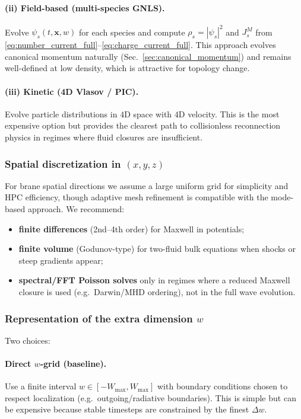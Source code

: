 \documentclass[11pt]{article}
\newcommand{\x}{\mathbf{x}}     %
\newcommand{\Js}{J_s}           %
\begin{document}
\paragraph{(ii) Field-based (multi-species GNLS).}
Evolve \(\psi_s(t,\x,w)\) for each species and compute \(\rho_s=|\psi_s|^2\) and
\(\Js^M\) from \eqref{eq:number_current_full}--\eqref{eq:charge_current_full}.
This approach evolves canonical momentum naturally (Sec.~\ref{sec:canonical_momentum})
and remains well-defined at low density, which is attractive for topology change.

\paragraph{(iii) Kinetic (4D Vlasov / PIC).}
Evolve particle distributions in \(4\)D space with \(4\)D velocity. This is the
most expensive option but provides the clearest path to collisionless reconnection
physics in regimes where fluid closures are insufficient.

\subsubsection*{Spatial discretization in \texorpdfstring{$(x,y,z)$}{(x,y,z)}}

For brane spatial directions we assume a large uniform grid for simplicity and
HPC efficiency, though adaptive mesh refinement is compatible with the mode-based
approach. We recommend:
\begin{itemize}[leftmargin=1.7em]
\item \textbf{finite differences} (2nd--4th order) for Maxwell in potentials;
\item \textbf{finite volume} (Godunov-type) for two-fluid bulk equations when shocks
or steep gradients appear;
\item \textbf{spectral/FFT Poisson solves} only in regimes where a reduced Maxwell
closure is used (e.g.\ Darwin/MHD ordering), not in the full wave evolution.
\end{itemize}

\subsubsection*{Representation of the extra dimension \texorpdfstring{$w$}{w}}

Two choices:

\paragraph{Direct \(w\)-grid (baseline).}
Use a finite interval \(w\in[-W_{\max},W_{\max}]\) with boundary conditions chosen
to respect localization (e.g.\ outgoing/radiative boundaries). This is simple but
can be expensive because stable timesteps are constrained by the finest \(\Delta w\).
\end{document}
